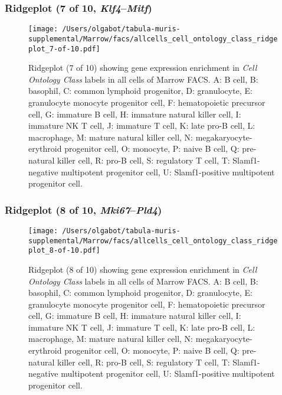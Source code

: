 \subsubsection{Ridgeplot (7 of 10, \emph{Klf4}--\emph{Mitf})}
\begin{figure}[h]
\centering
\texttt{[image: /Users/olgabot/tabula-muris-supplemental/Marrow/facs/allcells\_cell\_ontology\_class\_ridgeplot\_7-of-10.pdf]}

\caption{ Ridgeplot (7 of 10)  showing gene expression enrichment in \emph{Cell Ontology Class} labels in all cells of Marrow FACS. A: B cell, B: basophil, C: common lymphoid progenitor, D: granulocyte, E: granulocyte monocyte progenitor cell, F: hematopoietic precursor cell, G: immature B cell, H: immature natural killer cell, I: immature NK T cell, J: immature T cell, K: late pro-B cell, L: macrophage, M: mature natural killer cell, N: megakaryocyte-erythroid progenitor cell, O: monocyte, P: naive B cell, Q: pre-natural killer cell, R: pro-B cell, S: regulatory T cell, T: Slamf1-negative multipotent progenitor cell, U: Slamf1-positive multipotent progenitor cell.}
\end{figure}


\clearpage

\subsubsection{Ridgeplot (8 of 10, \emph{Mki67}--\emph{Pld4})}
\begin{figure}[h]
\centering
\texttt{[image: /Users/olgabot/tabula-muris-supplemental/Marrow/facs/allcells\_cell\_ontology\_class\_ridgeplot\_8-of-10.pdf]}

\caption{ Ridgeplot (8 of 10)  showing gene expression enrichment in \emph{Cell Ontology Class} labels in all cells of Marrow FACS. A: B cell, B: basophil, C: common lymphoid progenitor, D: granulocyte, E: granulocyte monocyte progenitor cell, F: hematopoietic precursor cell, G: immature B cell, H: immature natural killer cell, I: immature NK T cell, J: immature T cell, K: late pro-B cell, L: macrophage, M: mature natural killer cell, N: megakaryocyte-erythroid progenitor cell, O: monocyte, P: naive B cell, Q: pre-natural killer cell, R: pro-B cell, S: regulatory T cell, T: Slamf1-negative multipotent progenitor cell, U: Slamf1-positive multipotent progenitor cell.}
\end{figure}


\clearpage

